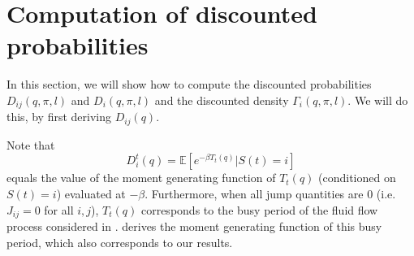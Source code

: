 \section{Computation of discounted probabilities}
In this section, we will show how to compute the discounted probabilities $D_{ij}(q,\pi,l)$ and $D_{i}(q,\pi,l)$ and the discounted density $\Gamma_i(q,\pi,l)$.
We will do this, by first deriving $D_{ij}(q)$.

\begin{remark}
Note that
\[
D_i^t(q)=\mathbb{E}[e^{-\beta T_t(q)}|S(t)=i]
\]	
equals the value of the moment generating function of $T_t(q)$ (conditioned on $S(t)=i$) evaluated at $-\beta$.
Furthermore, when all jump quantities are 0 (i.e. $J_{ij}=0$ for all $i,j$), $T_t(q)$ corresponds to the busy period of the fluid flow process considered in \cite{Asmussen1994}. 
\cite{Asmussen1994} derives the moment generating function of this busy period, which also corresponds to our results.
\end{remark}

